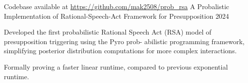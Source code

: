 \begin{cventries}
\cventry
{Codebase available at \url{https://github.com/mak2508/prob_rsa}} %
{A Probalistic Implementation of Rational-Speech-Act Framework for Presupposition} %
{} %
{2024} %
{
  \begin{cvitems} %
    \item {Developed the first probabilistic Rational Speech Act (RSA) model of presupposition triggering using the Pyro prob-
    abilistic programming framework, simplifying posterior distribution computations for more complex interactions.}
    \item {Formally proving a faster linear runtime, compared to previous exponential runtime.}
  \end{cvitems}
}

\end{cventries}
